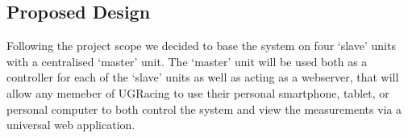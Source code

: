 \subsection{Proposed Design}
Following the project scope we decided to base the system on four `slave' units with a centralised `master' unit. The `master' unit will be used both as a controller for each of the `slave' units as well as acting as a webserver, that will allow any memeber of UGRacing to use their personal smartphone, tablet, or personal computer to both control the system and view the measurements via a universal web application.

 
